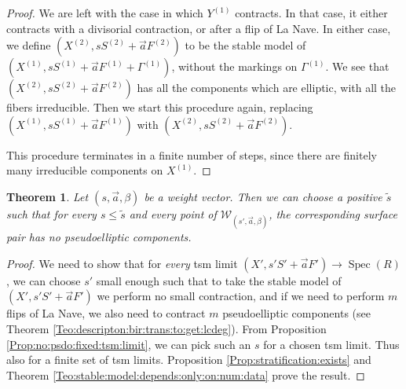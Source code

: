 \documentclass[11pt]{amsart}
\newcommand{\cE}{\mathcal{W}}
\newcommand{\spec}{\operatorname{Spec}}
\newtheorem{Teo}[theorem]{Theorem}
\theoremstyle{definition}
\begin{document}
\begin{proof}
 We are left with the case in which $Y^{(1)}$ contracts. In that case, it either contracts with a divisorial contraction, or after a flip of La Nave.
 In either case, we define $(X^{(2)},sS^{(2)}+\vec{a}F^{(2)})$ to be the stable model of $(X^{(1)},sS^{(1)}+\vec{a}F^{(1)}+\Gamma^{(1)})$, without the
 markings on $\Gamma^{(1)}$. We see that $(X^{(2)},sS^{(2)}+\vec{a}F^{(2)})$ has all the components which are elliptic, with all the fibers irreducible. Then we start this procedure again, replacing $(X^{(1)},sS^{(1)}+\vec{a}F^{(1)})$ with $(X^{(2)},sS^{(2)}+\vec{a}F^{(2)})$.
 
 This procedure terminates in a finite number of steps, since there are finitely many irreducible components on $X^{(1)}$.
\end{proof}
\begin{Teo}\label{Teo:no:psudo}
 Let $(s,\vec{a},\beta)$ be a weight vector. Then we can choose a positive $\widetilde{s}$ such that for every $s \le \widetilde{s}$ and every point of $ \cE_{(s',\vec{a},\beta)}$,
the corresponding surface pair
has no pseudoelliptic components.
\end{Teo}
\begin{proof} We need to show that for \emph{every} tsm limit $(X',s'S'+\vec{a}F') \to \spec(R)$, we can choose $s'$ small enough such that to take the stable model of $(X',s'S'+\vec{a}F')$ we perform no small contraction, and if we need to perform $m$ flips of La Nave, we also need to contract $m$ pseudoelliptic components (see Theorem \ref{Teo:descripton:bir:trans:to:get:lcdeg}).
 From Proposition \ref{Prop:no:psdo:fixed:tsm:limit}, we can pick such an $s$ for a chosen tsm limit. Thus also for a finite set of tsm limits.
Proposition \ref{Prop:stratification:exists} and
Theorem \ref{Teo:stable:model:depends:only:on:num:data} prove the result.
\end{proof}
\end{document}
